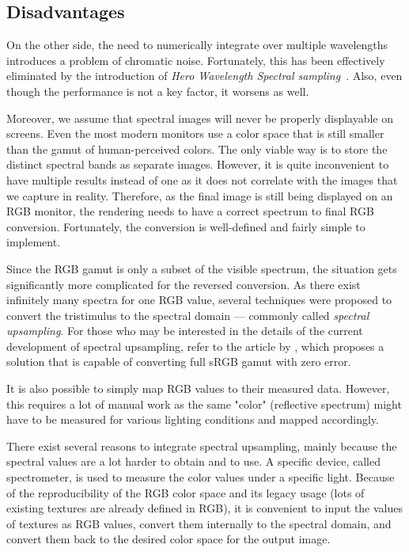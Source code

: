 \subsection{Disadvantages}

On the other side, the need to numerically integrate over multiple wavelengths introduces a problem of chromatic noise. Fortunately, this has been effectively eliminated by the introduction of \emph{Hero Wavelength Spectral sampling}~\cite{wilkie2014hero}. Also, even though the performance is not a key factor, it worsens as well. 

Moreover, we assume that spectral images will never be properly displayable on screens. Even the most modern monitors use a color space that is still smaller than the gamut of human-perceived colors. The only viable way is to store the distinct spectral bands as separate images. However, it is quite inconvenient to have multiple results instead of one as it does not correlate with the images that we capture in reality. Therefore, as the final image is still being displayed on an RGB monitor, the rendering needs to have a correct spectrum to final RGB conversion. Fortunately, the conversion is well-defined and fairly simple to implement.

Since the RGB gamut is only a subset of the visible spectrum, the situation gets significantly more complicated for the reversed conversion. As there exist infinitely many spectra for one RGB value, several techniques were proposed to convert the tristimulus to the spectral domain --- commonly called \emph{spectral upsampling}. For those who may be interested in the details of the current development of spectral upsampling, refer to the article by \citet{jakob2019low}, which proposes a solution that is capable of converting full sRGB gamut with zero error.

It is also possible to simply map RGB values to their measured data. However, this requires a lot of manual work as the same "color" (reflective spectrum) might have to be measured for various lighting conditions and mapped accordingly.

There exist several reasons to integrate spectral upsampling, mainly because the spectral values are a lot harder to obtain and to use. A specific device, called spectrometer, is used to measure the color values under a specific light. Because of the reproducibility of the RGB color space and its legacy usage (lots of existing textures are already defined in RGB), it is convenient to input the values of textures as RGB values, convert them internally to the spectral domain, and convert them back to the desired color space for the output image.
